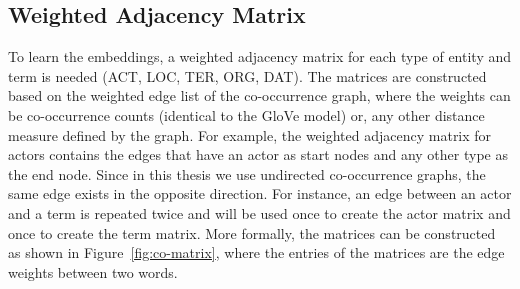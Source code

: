 \subsection{Weighted Adjacency Matrix}\label{sec:adj_matrix}
To learn the embeddings, a weighted adjacency matrix for each type of entity and term is needed (ACT, LOC, TER, ORG, DAT). The matrices are constructed based on the weighted edge list of the co-occurrence graph, where the weights can be co-occurrence counts (identical to the GloVe model) or, any other distance measure defined by the graph. For example, the weighted adjacency matrix for actors contains the edges that have an actor as start nodes and any other type as the end node. Since in this thesis we use undirected co-occurrence graphs, the same edge exists in the opposite direction. For instance, an edge between an actor and a term is repeated twice and will be used once to create the actor matrix and once to create the term matrix. More formally, the matrices can be constructed as shown in Figure~\ref{fig:co-matrix}, where the entries of the matrices are the edge weights between two words.  
